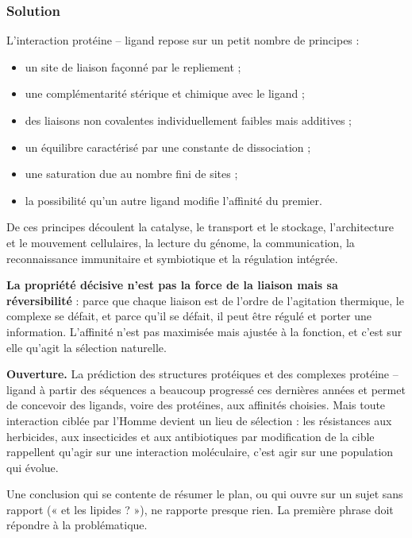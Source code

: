 \documentclass[11pt,a4paper]{article}
\providecommand{\tightlist}{\setlength{\itemsep}{0pt}\setlength{\parskip}{0pt}}
\begin{document}
\hypertarget{solution-7}{%
\subsubsection{Solution}\label{solution-7}}

L'interaction protéine -- ligand repose sur un petit nombre de principes :

\begin{itemize}
\tightlist
\item
  un site de liaison façonné par le repliement ;
\item
  une complémentarité stérique et chimique avec le ligand ;
\item
  des liaisons non covalentes individuellement faibles mais additives ;
\item
  un équilibre caractérisé par une constante de dissociation ;
\item
  une saturation due au nombre fini de sites ;
\item
  la possibilité qu'un autre ligand modifie l'affinité du premier.
\end{itemize}

De ces principes découlent la catalyse, le transport et le stockage, l'architecture et le mouvement cellulaires, la lecture du génome, la communication, la reconnaissance immunitaire et symbiotique et la régulation intégrée.

\textbf{La propriété décisive n'est pas la force de la liaison mais sa réversibilité} : parce que chaque liaison est de l'ordre de l'agitation thermique, le complexe se défait, et parce qu'il se défait, il peut être régulé et porter une information. L'affinité n'est pas maximisée mais ajustée à la fonction, et c'est sur elle qu'agit la sélection naturelle.

\textbf{Ouverture.} La prédiction des structures protéiques et des complexes protéine -- ligand à partir des séquences a beaucoup progressé ces dernières années et permet de concevoir des ligands, voire des protéines, aux affinités choisies. Mais toute interaction ciblée par l'Homme devient un lieu de sélection : les résistances aux herbicides, aux insecticides et aux antibiotiques par modification de la cible rappellent qu'agir sur une interaction moléculaire, c'est agir sur une population qui évolue.

\begin{piege}

Une conclusion qui se contente de résumer le plan, ou qui ouvre sur un sujet sans rapport (« et les lipides ? »), ne rapporte presque rien. La première phrase doit répondre à la problématique.

\end{piege}
\end{document}
